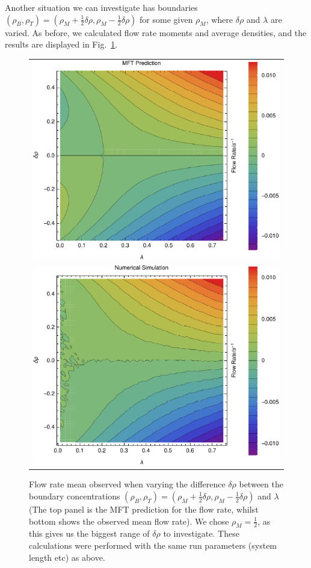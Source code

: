 \documentclass[
reprint,
 amsmath,amssymb,
 aps,
 prl,
]{revtex4-1}
\begin{document}
Another situation we can investigate has boundaries $(\rho_B, \rho_T) = (\rho_M + \frac{1}{2} \delta\rho, \rho_M - \frac{1}{2} \delta\rho)$ for some given $\rho_M$, where $\delta\rho$ and $\lambda$ are varied. As before, we calculated flow rate
moments and average densities, and the results are displayed in Fig.~\ref{fig:constDens}.
\begin{figure}[h!]
\vspace{1em}
\caption{\label{fig:constDens} Flow rate mean observed when varying the difference $\delta\rho$ between the boundary concentrations
$(\rho_B, \rho_T) = (\rho_M + \frac{1}{2} \delta\rho, \rho_M - \frac{1}{2} \delta\rho)$ and $\lambda$ (The top panel is the MFT prediction
for the flow rate, whilst bottom shows the observed mean flow rate).
We chose $\rho_M=\frac{1}{2}$, as this gives us the biggest range of $\delta\rho$ to investigate.
These calculations were performed with the same run parameters (system length etc)
as above.}
\begin{center}
 \begin{tabular}{c}
    \includegraphics[width=0.98\linewidth]{newMftPred} \\
    \includegraphics[width=0.98\linewidth]{newFlow}

\end{tabular}
\end{center}
\end{figure}
\end{document}
